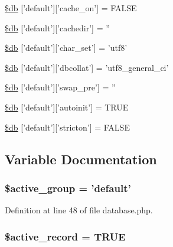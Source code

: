 \begin{DoxyCompactItemize}
\hyperlink{production_2database_8php_a05a82adb11460f351c1df4ae9be71866}{\$db} \mbox{[}'default'\mbox{]}\mbox{[}'cache\-\_\-on'\mbox{]} = F\-A\-L\-S\-E
\item 
\hyperlink{production_2database_8php_a12683252490249e3294aebaca97c4126}{\$db} \mbox{[}'default'\mbox{]}\mbox{[}'cachedir'\mbox{]} = ''
\item 
\hyperlink{production_2database_8php_a581bc2f1f3fa806239c44e2c2293dc59}{\$db} \mbox{[}'default'\mbox{]}\mbox{[}'char\-\_\-set'\mbox{]} = 'utf8'
\item 
\hyperlink{production_2database_8php_ab03697bf8340acfa74bf20c952aa81c7}{\$db} \mbox{[}'default'\mbox{]}\mbox{[}'dbcollat'\mbox{]} = 'utf8\-\_\-general\-\_\-ci'
\item 
\hyperlink{production_2database_8php_af35b6847ece1c0a956c97ebb90186e45}{\$db} \mbox{[}'default'\mbox{]}\mbox{[}'swap\-\_\-pre'\mbox{]} = ''
\item 
\hyperlink{production_2database_8php_a217a1c42eadc83da9cdd9e3d694e53fa}{\$db} \mbox{[}'default'\mbox{]}\mbox{[}'autoinit'\mbox{]} = T\-R\-U\-E
\item 
\hyperlink{production_2database_8php_a5722ababeee63dd26d82734e3fa83b7c}{\$db} \mbox{[}'default'\mbox{]}\mbox{[}'stricton'\mbox{]} = F\-A\-L\-S\-E
\end{DoxyCompactItemize}


\subsection{Variable Documentation}
\hypertarget{production_2database_8php_a5046ea83a698c5b7bbf6ffd3dd816b65}{
\subsubsection[{\$active\-\_\-group}]{\setlength{\rightskip}{0pt plus 5cm}\$active\-\_\-group = 'default'}}\label{production_2database_8php_a5046ea83a698c5b7bbf6ffd3dd816b65}


Definition at line 48 of file database.\-php.

\hypertarget{production_2database_8php_a228b6ea91602f48a8831d0dc94809b94}{
\subsubsection[{\$active\-\_\-record}]{\setlength{\rightskip}{0pt plus 5cm}\$active\-\_\-record = T\-R\-U\-E}}\label{production_2database_8php_a228b6ea91602f48a8831d0dc94809b94}



